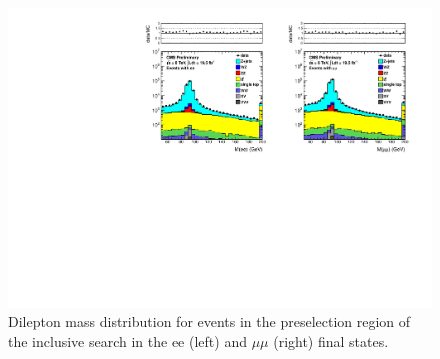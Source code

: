 \begin{figure}[hbt]
  \begin{center}
	\includegraphics[width=1.0\linewidth]{plots/dilmass_2jets_19p5fb.pdf}
	\caption{
	  \label{fig:dilmass_2j}\protect 
	  Dilepton mass distribution for events in the preselection region of the inclusive search
	  in the ee (left) and $\mu\mu$ (right) final states.}



  \end{center}
\end{figure}

